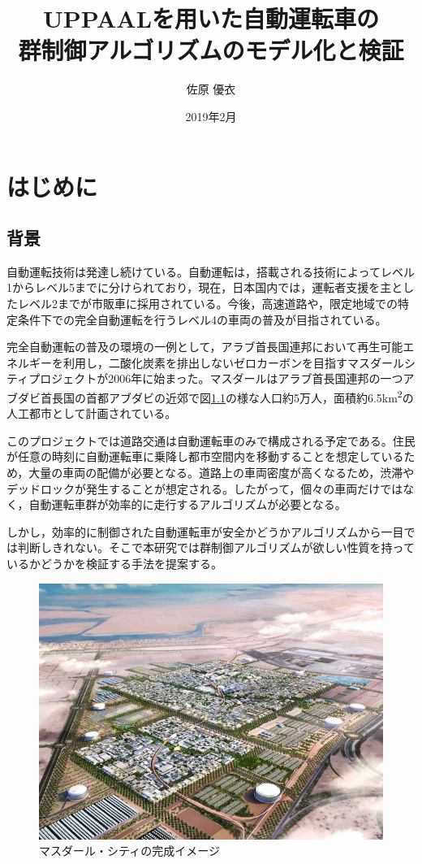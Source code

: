 \documentclass{tpu-sotu}
\title{UPPAALを用いた自動運転車の\\群制御アルゴリズムのモデル化と検証}
\author{佐原 優衣}
\date{2019年2月}
\begin{document}
\maketitle
\clearpage
{}
\setcounter{tocdepth}{3}
\tableofcontents
\clearpage
{}

\chapter{はじめに}
	\section{背景}
	自動運転技術は発達し続けている。自動運転は，搭載される技術によってレベル1からレベル5までに分けられており，現在，日本国内では，運転者支援を主としたレベル2までが市販車に採用されている。今後，高速道路や，限定地域での特定条件下での完全自動運転を行うレベル4の車両の普及が目指されている。
	
	完全自動運転の普及の環境の一例として，アラブ首長国連邦において再生可能エネルギーを利用し，二酸化炭素を排出しないゼロカーボンを目指すマスダールシティプロジェクトが2006年に始まった。マスダールはアラブ首長国連邦の一つアブダビ首長国の首都アブダビの近郊で図\ref{Masdar}の様な人口約5万人，面積約6.5\si{km^{2}}の人工都市として計画されている。
	
	このプロジェクトでは道路交通は自動運転車のみで構成される予定である。住民が任意の時刻に自動運転車に乗降し都市空間内を移動することを想定しているため，大量の車両の配備が必要となる。道路上の車両密度が高くなるため，渋滞やデッドロックが発生することが想定される。したがって，個々の車両だけではなく，自動運転車群が効率的に走行するアルゴリズムが必要となる。
	
	しかし，効率的に制御された自動運転車が安全かどうかアルゴリズムから一目では判断しきれない。そこで本研究では群制御アルゴリズムが欲しい性質を持っているかどうかを検証する手法を提案する。
	\begin{figure}[htbp]
	\centering
	\includegraphics[width=130mm]{Masdar.jpg}
	\caption{マスダール・シティの完成イメージ \protect \footnotemark}
	\label{Masdar}
	\end{figure}
	\newpage
\end{document}
